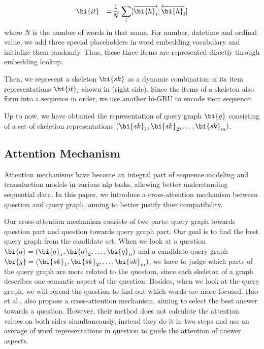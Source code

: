 \begin{equation}
\label{eqn:item}
\begin{aligned}
& \bi{it} & = & \frac{1}{N}\sum_{i}[\overrightarrow{\bi{h}_i};\overleftarrow{\bi{h}_i}]\\
\end{aligned}
\end{equation}
\noindent
where $N$ is the number of words in that name.
For number, datetime and ordinal value, we add three special placeholders in word embedding vocabulary and initialize them randomly. Thus, these three items are represented directly through embedding lookup. 


Then, we represent a skeleton $\bi{sk}$ as a dynamic combination of its item representations $\bi{it}_i$ shown in  (right side). Since the items of a skeleton also form into a sequence in order, we use another bi-GRU to encode item sequence.

Up to now, we have obtained the representation of query graph $\bi{g}$ consisting of a set of skeletion representations $(\bi{sk}_1, \bi{sk}_2, \dots, \bi{sk}_m)$.




\subsection{Attention Mechanism}
\label{sec:attention}

Attention mechanisms \cite{bahdanau2014neural,luong2015effective} have become an integral part of sequence modeling and transduction models in various nlp tasks, allowing better understanding sequential data. In this paper, we introduce a cross-attention mechanism between question and query graph, aiming to better justify thier compatibility.

Our cross-attention mechanism consists of two parts: query graph towards question part and question towards query graph part. Our goal is to find the best query graph from the candidate set. When we look at a question $\bi{q} = (\bi{q}_1, \bi{q}_2, \dots, \bi{q}_n)$ and a candidate query graph $\bi{g} = (\bi{sk}_1, \bi{sk}_2, \dots, \bi{sk}_m)$, we have to judge which parts of the query graph are more related to the question, since each skeleton of a graph describes one semantic aspect of the question. Besides, when we look at the query graph, we will reread the question to find out which words are more focused. Hao et al., \cite{hao2017end} also propose a cross-attention mechanism, aiming to select the best answer towards a question. However, their method does not calculate the attention values on both sides simultaneously, instead they do it in two steps and use an average of word representations in question to guide the attention of answer aspects. 

